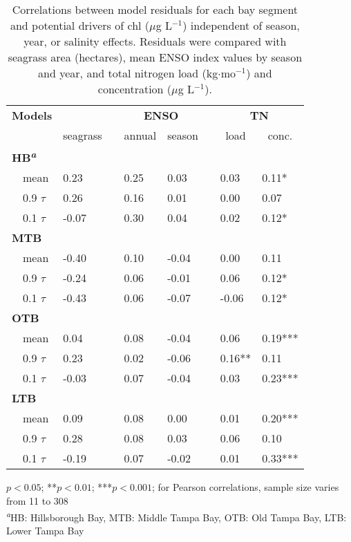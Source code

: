 \documentclass{svjour3}\usepackage[]{graphicx}\usepackage[]{color}
\newcommand{\mugl}{$\mu$g L$^{-1}$}
\begin{document}
%
\begin{table}[!tbp]
\caption{Correlations between model residuals for each bay segment and potential drivers of \ac{chl} (\mugl) independent of season, year, or salinity effects. Residuals were compared with seagrass area (hectares), mean ENSO index values by season and year, and total nitrogen load (kg$\cdot$mo$^{-1}$) and concentration (\mugl).\label{tab:cormat}} 
\begin{center}
\begin{tabular}{llcllcll}
\hline\hline
\multicolumn{1}{l}{\bfseries Models}&\multicolumn{1}{c}{\bfseries }&\multicolumn{1}{c}{\bfseries }&\multicolumn{2}{c}{\bfseries ENSO}&\multicolumn{1}{c}{\bfseries }&\multicolumn{2}{c}{\bfseries TN}\tabularnewline
\cline{4-5} \cline{7-8}
\multicolumn{1}{l}{}&\multicolumn{1}{c}{seagrass}&\multicolumn{1}{c}{}&\multicolumn{1}{c}{annual}&\multicolumn{1}{c}{season}&\multicolumn{1}{c}{}&\multicolumn{1}{c}{load}&\multicolumn{1}{c}{conc.}\tabularnewline
\hline
{\bfseries HB\textsuperscript{\textit{a}}}&&&&&&&\tabularnewline
~~mean&0.23 &&0.25 &0.03 &&0.03 &0.11*\tabularnewline
~~0.9 $\tau$&0.26 &&0.16 &0.01 &&0.00 &0.07 \tabularnewline
~~0.1 $\tau$&-0.07 &&0.30 &0.04 &&0.02 &0.12*\tabularnewline
\hline
{\bfseries MTB}&&&&&&&\tabularnewline
~~mean&-0.40 &&0.10 &-0.04 &&0.00 &0.11 \tabularnewline
~~0.9 $\tau$&-0.24 &&0.06 &-0.01 &&0.06 &0.12*\tabularnewline
~~0.1 $\tau$&-0.43 &&0.06 &-0.07 &&-0.06 &0.12*\tabularnewline
\hline
{\bfseries OTB}&&&&&&&\tabularnewline
~~mean&0.04 &&0.08 &-0.04 &&0.06 &0.19***\tabularnewline
~~0.9 $\tau$&0.23 &&0.02 &-0.06 &&0.16**&0.11 \tabularnewline
~~0.1 $\tau$&-0.03 &&0.07 &-0.04 &&0.03 &0.23***\tabularnewline
\hline
{\bfseries LTB}&&&&&&&\tabularnewline
~~mean&0.09 &&0.08 &0.00 &&0.01 &0.20***\tabularnewline
~~0.9 $\tau$&0.28 &&0.08 &0.03 &&0.06 &0.10 \tabularnewline
~~0.1 $\tau$&-0.19 &&0.07 &-0.02 &&0.01 &0.33***\tabularnewline
\hline
\end{tabular}
\end{center}
\footnotesize *$p<0.05$; **$p<0.01$; ***$p<0.001$; for Pearson correlations, sample size varies from 11 to 308\\\textsuperscript{\textit{a}}HB: Hillsborough Bay, MTB: Middle Tampa Bay, OTB: Old Tampa Bay, LTB: Lower Tampa Bay\end{table}
\end{document}
